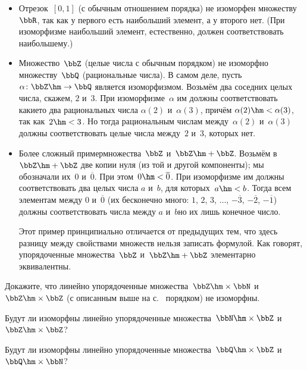 \begin{itemize}
\item
Отрезок~$[0,1]$ (с обычным отношением порядка)
не изоморфен множеству~$\bbR$, так как у первого
есть наибольший элемент, а у второго нет. (При изоморфизме
наибольший элемент, естественно, должен соответствовать
наибольшему.)
\item
Множество~$\bbZ$ (целые числа с обычным порядком)
не изоморфно множеству~$\bbQ$ (рациональные числа).
В самом деле, пусть $\alpha\colon\bbZ\hm\to\bbQ$ является изоморфизмом.
Возьмём два соседних целых
числа, скажем, $2$ и~$3$.
При изоморфизме~$\alpha$ им должны соответствовать какие\д то два
рациональных числа $\alpha(2)$ и~$\alpha(3)$, причём
$\alpha(2)\hm<\alpha(3)$, так как~$2\hm<3$. Но тогда рациональным
числам между~$\alpha(2)$ и~$\alpha(3)$ должны соответствовать
целые числа между~$2$ и~$3$, которых нет.
\item
Более сложный пример\т множества~$\bbZ$ и~$\bbZ\hm+\bbZ$.
Возьмём в~$\bbZ\hm+\bbZ$ две
копии нуля (из той и другой компоненты); мы обозначали их~$0$ и~$\overline 0$.
При этом~$0\hm<\overline 0$. При изоморфизме им должны
соответствовать два целых числа $a$ и~$b$, для
которых~$a\hm<b$. Тогда всем элементам между $0$ и~$\overline 0$ (их бесконечно
много: $1$, $2$, $3$, $\dots$, $-\overline3$, $-\overline2$, $-\overline1$)
должны соответствовать числа между $a$ и~$b$\т но их лишь конечное
число.

Этот пример принципиально отличается от предыдущих тем, что
здесь разницу между свойствами множеств нельзя записать
формулой. Как говорят,
упорядоченные множества~$\bbZ$
и~$\bbZ\hm+\bbZ$  элементарно эквивалентны.
\end{itemize}

\begin{problem}
Докажите, что линейно упорядоченные
множества~$\bbZ\hm\times\bbN$ и~$\bbZ\hm\times\bbZ$ (с
описанным выше на с.~\pageref{linear-cartesian-product} порядком) не
изоморфны.
\end{problem}

\begin{problem}
Будут ли изоморфны линейно упорядоченные
множества~$\bbN\hm\times\bbZ$ и~$\bbZ\hm\times\bbZ$?
\end{problem}

\begin{problem}
Будут ли изоморфны линейно упорядоченные
множества~$\bbQ\hm\times\bbZ$ и~$\bbQ\hm\times\bbN$?
\end{problem}

